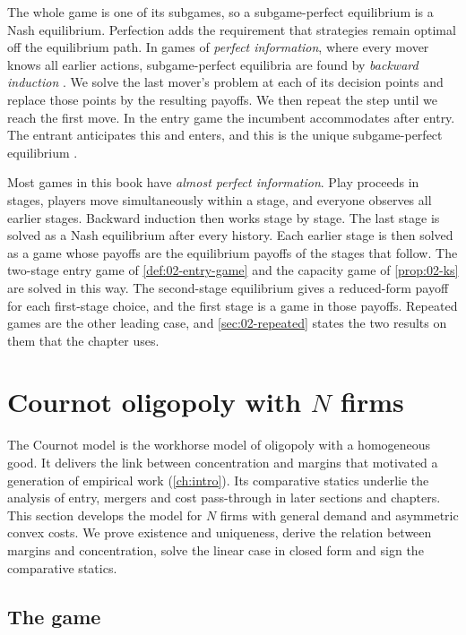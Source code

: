 The whole game is one of its subgames, so a subgame-perfect equilibrium is a Nash equilibrium. Perfection adds the
requirement that strategies remain optimal off the equilibrium path. In games of \emph{perfect information}, where
every mover knows all earlier actions, subgame-perfect equilibria are found by \emph{backward induction}
\citep{Kuhn1953}. We solve the last mover's problem at each of its decision points and replace those points by the
resulting payoffs. We then repeat the step until we reach the first move. In the entry game the incumbent accommodates
after entry. The entrant anticipates this and enters, and this is the unique subgame-perfect equilibrium
\citep[secs.~11.3 and 11.3.1]{Tirole1988}.

Most games in this book have \emph{almost perfect information}. Play proceeds in stages, players move simultaneously
within a stage, and everyone observes all earlier stages. Backward induction then works stage by stage. The last
stage is solved as a Nash equilibrium after every history. Each earlier stage is then solved as a game whose payoffs
are the equilibrium payoffs of the stages that follow. The two-stage entry game of \cref{def:02-entry-game} and the
capacity game of \cref{prop:02-ks} are solved in this way. The second-stage equilibrium gives a reduced-form payoff
for each first-stage choice, and the first stage is a game in those payoffs. Repeated games are the other leading
case, and \cref{sec:02-repeated} states the two results on them that the chapter uses.

\section{Cournot oligopoly with \texorpdfstring{$N$}{N} firms}\label{sec:02-cournot}

The Cournot model is the workhorse model of oligopoly with a homogeneous good. It delivers the link between
concentration and margins that motivated a generation of empirical work (\cref{ch:intro}). Its comparative statics
underlie the analysis of entry, mergers and cost pass-through in later sections and chapters. This section develops
the model for $N$ firms with general demand and asymmetric convex costs. We prove existence and uniqueness, derive
the relation between margins and concentration, solve the linear case in closed form and sign the comparative
statics.

\subsection{The game}\label{sec:02-cournot-game}

